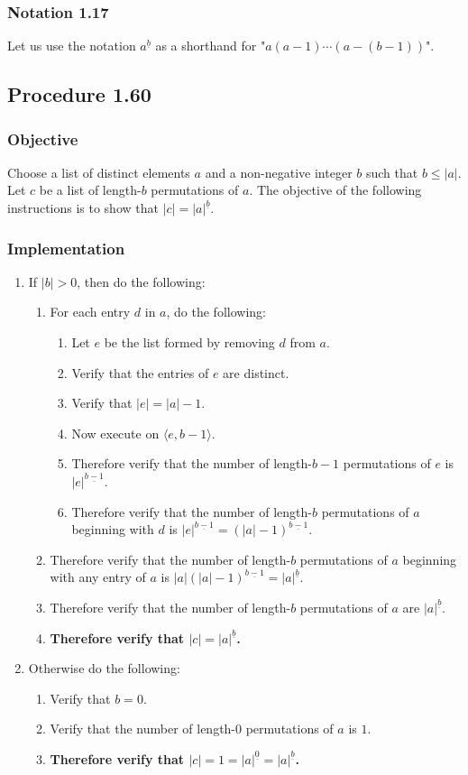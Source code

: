 \documentclass[twocolumn]{article}
\newcommand{\ul}[1]{\underline{#1}}
\newcommand{\notation}[1]{\subsubsection*{Notation #1}}
\newcommand{\procedure}[2][]{\subsection*{Procedure #2 \ifthenelse{\equal{#1}{}}{}{(#1)}}\label{sec:procedure #2}}
\newcommand{\objective}{\subsubsection*{Objective}}
\newcommand{\implementation}{\subsubsection*{Implementation}}
\newcommand{\procedurehr}[2][]{\hyperref[sec:procedure #2]{\ifthenelse{\equal{#1}{}}{procedure #2}{#1}}}
\begin{document}
		\notation{1.17}
			Let us use the notation $a^{\ul{b}}$ as a shorthand for "$a(a-1)\cdots(a-(b-1))$".
		\procedure{1.60}
			\objective
				Choose a list of distinct elements $a$ and a non-negative integer $b$ such that $b\le\lvert a\rvert$. Let $c$ be a list of length-$b$ permutations of $a$. The objective of the following instructions is to show that $\lvert c\rvert=\lvert a\rvert^{\ul{b}}$.
			\implementation
				\begin{enumerate}
					\item If $\lvert b\rvert>0$, then do the following:
					\begin{enumerate}
						\item For each entry $d$ in $a$, do the following:
						\begin{enumerate}
							\item Let $e$ be the list formed by removing $d$ from $a$.
							\item Verify that the entries of $e$ are distinct.
							\item Verify that $\lvert e\rvert=\lvert a\rvert-1$.
							\item Now execute \procedurehr{1.60} on $\langle e,b-1\rangle$.
							\item Therefore verify that the number of length-$b-1$ permutations of $e$ is $\lvert e\rvert^{\ul{b-1}}$.
							\item Therefore verify that the number of length-$b$ permutations of $a$ beginning with $d$ is $\lvert e\rvert^{\ul{b-1}}=(\lvert a\rvert-1)^{\ul{b-1}}$.
						\end{enumerate}
						\item Therefore verify that the number of length-$b$ permutations of $a$ beginning with any entry of $a$ is $\lvert a\rvert(\lvert a\rvert-1)^{\ul{b-1}}=\lvert a\rvert^{\ul{b}}$.
						\item Therefore verify that the number of length-$b$ permutations of $a$ are $\lvert a\rvert^{\ul{b}}$.
						\item \textbf{Therefore verify that $\lvert c\rvert=\lvert a\rvert^{\ul{b}}$.}
					\end{enumerate}
					\item Otherwise do the following:
					\begin{enumerate}
						\item Verify that $b=0$.
						\item Verify that the number of length-$0$ permutations of $a$ is $1$.
						\item \textbf{Therefore verify that $\lvert c\rvert=1=\lvert a\rvert^{\ul{0}}=\lvert a\rvert^{\ul{b}}$.}
					\end{enumerate}
				\end{enumerate}
\end{document}
